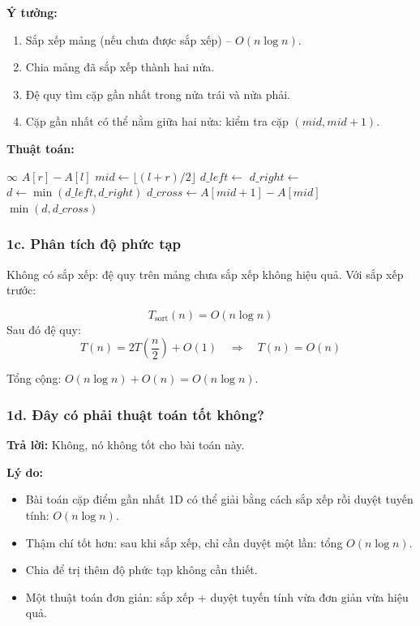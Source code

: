 \documentclass{article}
\begin{document}
\textbf{Ý tưởng:}
\begin{enumerate}
    \item Sắp xếp mảng (nếu chưa được sắp xếp) – \(O(n \log n)\).
    \item Chia mảng đã sắp xếp thành hai nửa.
    \item Đệ quy tìm cặp gần nhất trong nửa trái và nửa phải.
    \item Cặp gần nhất có thể nằm giữa hai nửa: kiểm tra cặp \((mid, mid+1)\).
\end{enumerate}

\textbf{Thuật toán:}

\begin{algorithmic}[1]
        \State \Return $\infty$
        \State \Return $A[r] - A[l]$
    \Else
        \State $mid \gets \lfloor (l + r)/2 \rfloor$
        \State $d\_left \gets$ 
        \State $d\_right \gets$ 
        \State $d \gets \min(d\_left, d\_right)$
        \State $d\_cross \gets A[mid+1] - A[mid]$ 
        \State \Return $\min(d, d\_cross)$
    \EndIf
\EndFunction
\end{algorithmic}

\subsubsection{1c. Phân tích độ phức tạp}

Không có sắp xếp: đệ quy trên mảng chưa sắp xếp không hiệu quả.  
Với sắp xếp trước:

\[
T_{\text{sort}}(n) = O(n \log n)
\]
Sau đó đệ quy:
\[
T(n) = 2T\left(\frac{n}{2}\right) + O(1) \quad\Rightarrow\quad T(n) = O(n)
\]

Tổng cộng: \(O(n \log n) + O(n) = O(n \log n)\).

\subsubsection{1d. Đây có phải thuật toán tốt không?}

\textbf{Trả lời:} Không, nó không tốt cho bài toán này.

\textbf{Lý do:}
\begin{itemize}
    \item Bài toán cặp điểm gần nhất 1D có thể giải bằng cách sắp xếp rồi duyệt tuyến tính: \(O(n \log n)\).
    \item Thậm chí tốt hơn: sau khi sắp xếp, chỉ cần duyệt một lần: tổng \(O(n \log n)\).
    \item Chia để trị thêm độ phức tạp không cần thiết.
    \item Một thuật toán đơn giản: sắp xếp + duyệt tuyến tính vừa đơn giản vừa hiệu quả.
\end{itemize}
\end{document}
